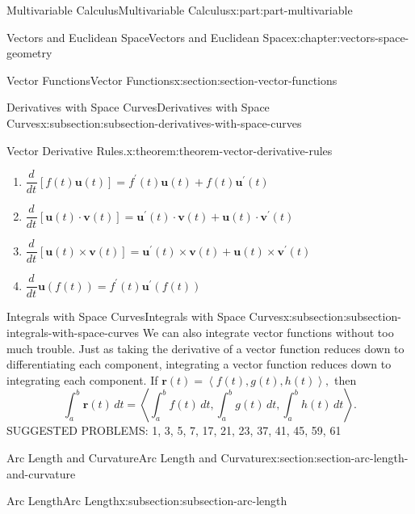\documentclass[twoside,10pt,]{tufte-book}
\numberwithin{equation}{part}
\newcommand{\dv}[3][]{\dfrac{d^{#1} #2}{d #3^{#1}}}
\newcommand{\dotprod}[1]{\left\langle #1 \right\rangle}
\begin{document}
\begin{partptx}{Multivariable Calculus}{}{Multivariable Calculus}{}{}{x:part:part-multivariable}
\begin{chapterptx}{Vectors and Euclidean Space}{}{Vectors and Euclidean Space}{}{}{x:chapter:vectors-space-geometry}
\begin{sectionptx}{Vector Functions}{}{Vector Functions}{}{}{x:section:section-vector-functions}
\begin{subsectionptx}{Derivatives with Space Curves}{}{Derivatives with Space Curves}{}{}{x:subsection:subsection-derivatives-with-space-curves}
\begin{theorem}{Vector Derivative Rules.}{}{x:theorem:theorem-vector-derivative-rules}
\begin{enumerate}
\item{}\(\displaystyle \dv{}{t}[f(t)\mathbf{u}(t)] = f^{\prime}(t)\mathbf{u}(t)+f(t)\mathbf{u}^{\prime}(t)\)%
\item{}\(\displaystyle \dv{}{t}[\mathbf{u}(t)\cdot\mathbf{v}(t)] = \mathbf{u}^{\prime}(t)\cdot\mathbf{v}(t)+\mathbf{u}(t)\cdot\mathbf{v}^{\prime}(t)\)%
\item{}\(\displaystyle \dv{}{t}[\mathbf{u}(t)\times\mathbf{v}(t)] = \mathbf{u}^{\prime}(t)\times\mathbf{v}(t)+\mathbf{u}(t)\times\mathbf{v}^{\prime}(t)\)%
\item{}\(\displaystyle \dv{}{t}\mathbf{u}(f(t)) = f^{\prime}(t)\mathbf{u}^{\prime}(f(t))\)%
\end{enumerate}
\end{theorem}
\end{subsectionptx}
%
%
\typeout{************************************************}
\typeout{************************************************}
%
\begin{subsectionptx}{Integrals with Space Curves}{}{Integrals with Space Curves}{}{}{x:subsection:subsection-integrals-with-space-curves}
We can also integrate vector functions without too much trouble. Just as taking the derivative of a vector function reduces down to differentiating each component, integrating a vector function reduces down to integrating each component. If \(\mathbf{r}(t) = \dotprod{f(t),g(t),h(t)},\) then%
%
\begin{equation}
\int_{a}^{b}\mathbf{r}(t)\,dt = \dotprod{\int_{a}^{b}f(t)\,dt,\int_{a}^{b}g(t)\,dt,\int_{a}^{b}h(t)\,dt}.\label{x:men:equation-vector-function-integration}
\end{equation}
SUGGESTED PROBLEMS: 1, 3, 5, 7, 17, 21, 23, 37, 41, 45, 59, 61%
\end{subsectionptx}
\end{sectionptx}
%
%
\typeout{************************************************}
\typeout{************************************************}
%
\begin{sectionptx}{Arc Length and Curvature}{}{Arc Length and Curvature}{}{}{x:section:section-arc-length-and-curvature}
%
%
\typeout{************************************************}
\typeout{************************************************}
%
\begin{subsectionptx}{Arc Length}{}{Arc Length}{}{}{x:subsection:subsection-arc-length}

\end{subsectionptx}
\end{sectionptx}
\end{chapterptx}
\end{partptx}
\end{document}
